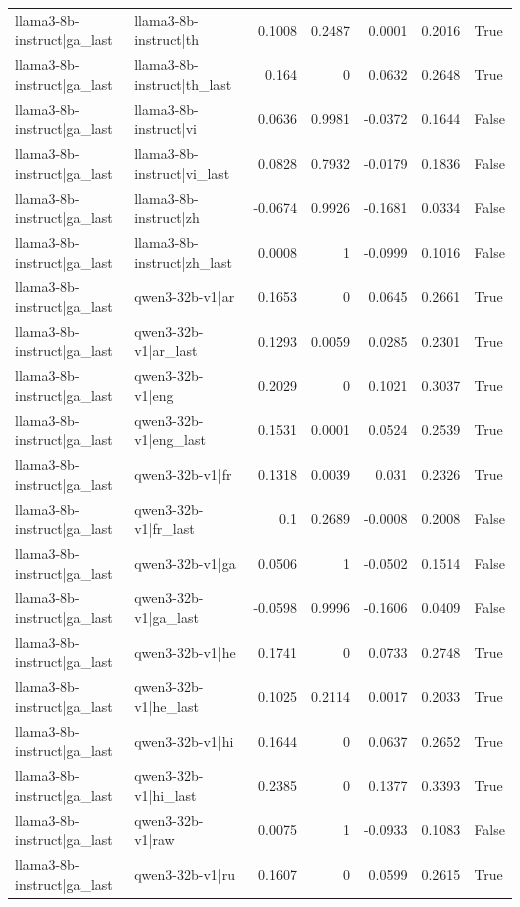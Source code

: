 \begin{table}
\begin{tabular}{l l r r r r l}
llama3-8b-instruct|ga_last & llama3-8b-instruct|th & 0.1008 & 0.2487 & 0.0001 & 0.2016 & True \\
llama3-8b-instruct|ga_last & llama3-8b-instruct|th_last & 0.164 & 0 & 0.0632 & 0.2648 & True \\
llama3-8b-instruct|ga_last & llama3-8b-instruct|vi & 0.0636 & 0.9981 & -0.0372 & 0.1644 & False \\
llama3-8b-instruct|ga_last & llama3-8b-instruct|vi_last & 0.0828 & 0.7932 & -0.0179 & 0.1836 & False \\
llama3-8b-instruct|ga_last & llama3-8b-instruct|zh & -0.0674 & 0.9926 & -0.1681 & 0.0334 & False \\
llama3-8b-instruct|ga_last & llama3-8b-instruct|zh_last & 0.0008 & 1 & -0.0999 & 0.1016 & False \\
llama3-8b-instruct|ga_last & qwen3-32b-v1|ar & 0.1653 & 0 & 0.0645 & 0.2661 & True \\
llama3-8b-instruct|ga_last & qwen3-32b-v1|ar_last & 0.1293 & 0.0059 & 0.0285 & 0.2301 & True \\
llama3-8b-instruct|ga_last & qwen3-32b-v1|eng & 0.2029 & 0 & 0.1021 & 0.3037 & True \\
llama3-8b-instruct|ga_last & qwen3-32b-v1|eng_last & 0.1531 & 0.0001 & 0.0524 & 0.2539 & True \\
llama3-8b-instruct|ga_last & qwen3-32b-v1|fr & 0.1318 & 0.0039 & 0.031 & 0.2326 & True \\
llama3-8b-instruct|ga_last & qwen3-32b-v1|fr_last & 0.1 & 0.2689 & -0.0008 & 0.2008 & False \\
llama3-8b-instruct|ga_last & qwen3-32b-v1|ga & 0.0506 & 1 & -0.0502 & 0.1514 & False \\
llama3-8b-instruct|ga_last & qwen3-32b-v1|ga_last & -0.0598 & 0.9996 & -0.1606 & 0.0409 & False \\
llama3-8b-instruct|ga_last & qwen3-32b-v1|he & 0.1741 & 0 & 0.0733 & 0.2748 & True \\
llama3-8b-instruct|ga_last & qwen3-32b-v1|he_last & 0.1025 & 0.2114 & 0.0017 & 0.2033 & True \\
llama3-8b-instruct|ga_last & qwen3-32b-v1|hi & 0.1644 & 0 & 0.0637 & 0.2652 & True \\
llama3-8b-instruct|ga_last & qwen3-32b-v1|hi_last & 0.2385 & 0 & 0.1377 & 0.3393 & True \\
llama3-8b-instruct|ga_last & qwen3-32b-v1|raw & 0.0075 & 1 & -0.0933 & 0.1083 & False \\
llama3-8b-instruct|ga_last & qwen3-32b-v1|ru & 0.1607 & 0 & 0.0599 & 0.2615 & True \\

\end{tabular}
\end{table}
